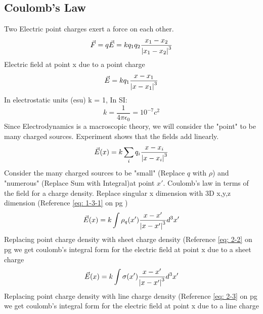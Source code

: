 \documentclass[12pt]{article}
\begin{document}
\subsection{Coulomb's Law} \label{subsection3-2}
    Two Electric point charges exert a force on each other.
    \begin{equation} \label{eq: 3-2-1}
        \vec{F} = q \vec{E} = k q_1 q_2 \frac{x_1-x_2}{\abs{x_1-x_2}^3}
    \end{equation}
    \newline Electric field at point x due to a point charge
    \begin{equation} \label{eq: 3-2-2}
        \vec{E} = k q_1 \frac{x-x_1}{\abs{x-x_1}^3}
    \end{equation}
    \newline In electrostatic units (esu) k = 1, In SI:
    \begin{equation} \label{eq: 3-2-3}
        k = \frac{1}{4 \pi \epsilon_0} = 10^{-7} c^2
    \end{equation}
    \newline Since Electrodynamics is a macroscopic theory, we will consider the "point" to be many charged sources. Experiment shows that the fields add linearly.
    \begin{equation} \label{eq: 3-2-4}
        \vec{E}(x)= k \sum_i q_i \frac{x-x_i}{\abs{x - x_i}^3}
    \end{equation}
    \newline Consider the many charged sources to be "small" (Replace $q$ with $\rho$) and "numerous" (Replace Sum with Integral)at point $x'$. Coulomb's law in terms of the field for a charge density. Replace singular x dimension with 3D x,y,z dimension (Reference \ref{eq: 1-3-1} on pg \pageref{eq: 1-3-1})
    \begin{equation} \label{eq: 3-2-5}
        \vec{E}(x)= k \int \rho_q(x') \frac{x-x'}{\abs{x - x'}^3}d^3x'
    \end{equation}
    \newline Replacing point charge density with sheet charge density (Reference \ref{eq: 2-2} on pg \pageref{eq: 2-2} we get coulomb's integral form for the electric field at point x due to a sheet charge
    \begin{equation} \label{eq: 3-2-6}
        \vec{E}(x)= k \int \sigma(x') \frac{x-x'}{\abs{x - x'}^3}d^3x'
    \end{equation}
    \newline Replacing point charge density with line charge density (Reference \ref{eq: 2-3} on pg \pageref{eq: 2-3} we get coulomb's integral form for the electric field at point x due to a line charge
\end{document}
